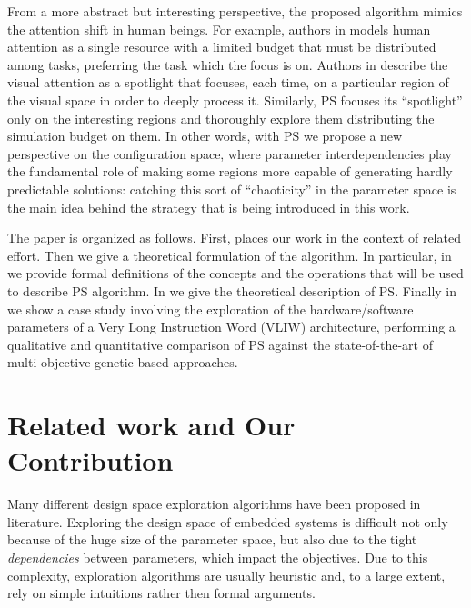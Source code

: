 From a more abstract but interesting perspective, the proposed
algorithm mimics the attention shift in human beings. For example,
authors in \cite{attention} models human attention as a single
resource with a limited budget that must be distributed among tasks,
preferring the task which the focus is on.  Authors in
\cite{spatial_attention} describe the visual attention as a spotlight
that focuses, each time, on a particular region of the visual space in
order to deeply process it. Similarly, PS focuses its
``spotlight'' only on the interesting regions and thoroughly explore them distributing the simulation budget on them.
In other words, with PS we propose a new perspective on the configuration space,
where parameter interdependencies play the fundamental role of making
some regions more capable of generating hardly predictable solutions:
catching this sort of ``chaoticity'' in the parameter space is the
main idea behind the strategy that is being introduced in this work.


The paper is organized as follows. First,  places our work in the context of related effort.
Then we give a theoretical formulation of the algorithm. In particular, in  we provide formal definitions of the concepts and the operations that will be used to describe PS algorithm. In  we give the theoretical description of PS. 
Finally in  we show a case
study involving the exploration of the hardware/software parameters of
a Very Long Instruction Word (VLIW) architecture, performing a
qualitative and quantitative comparison of PS against the state-of-the-art
of multi-objective genetic based approaches.


\section{Related work and Our Contribution}
Many different design space exploration algorithms have been proposed
in literature. Exploring the design space of embedded systems is difficult not only because of the huge size of the parameter space, but also due to the tight \emph{dependencies} between parameters, which impact the objectives.
Due to this complexity, exploration algorithms are usually heuristic and, to a large extent, rely on simple intuitions rather then formal arguments.


